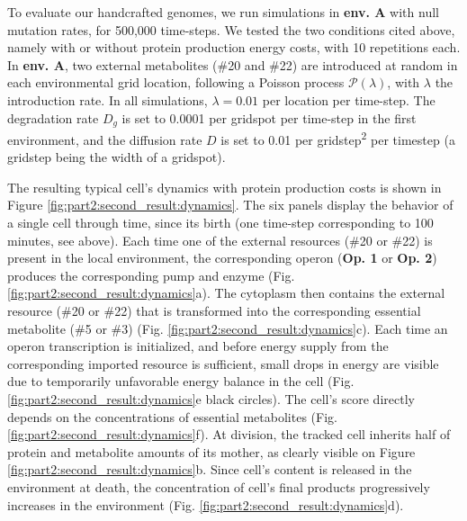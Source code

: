 To evaluate our handcrafted genomes, we run simulations in \textbf{env. A} with null mutation rates, for 500,000 time-steps. We tested the two conditions cited above, namely with or without protein production energy costs, with 10 repetitions each. In \textbf{env. A}, two external metabolites (\#20 and \#22) are introduced at random in each environmental grid location, following a Poisson process $\mathcal{P}(\lambda)$, with $\lambda$ the introduction rate. In all simulations, $\lambda=0.01$ per location per time-step. The degradation rate $D_g$ is set to 0.0001 per gridspot per time-step in the first environment, and the diffusion rate $D$ is set to 0.01 per gridstep\textsuperscript{2} per timestep (a gridstep being the width of a gridspot).

The resulting typical cell's dynamics with protein production costs is shown in Figure \ref{fig:part2:second_result:dynamics}. The six panels display the behavior of a single cell through time, since its birth (one time-step corresponding to 100 minutes, see above). Each time one of the external resources (\#20 or \#22) is present in the local environment, the corresponding operon (\textbf{Op. 1} or \textbf{Op. 2}) produces the corresponding pump and enzyme (Fig. \ref{fig:part2:second_result:dynamics}a). The cytoplasm then contains the external resource (\#20 or \#22) that is transformed into the corresponding essential metabolite (\#5 or \#3) (Fig. \ref{fig:part2:second_result:dynamics}c). Each time an operon transcription is initialized, and before energy supply from the corresponding imported resource is sufficient, small drops in energy are visible due to temporarily unfavorable energy balance in the cell (Fig. \ref{fig:part2:second_result:dynamics}e black circles). The cell's score directly depends on the concentrations of essential metabolites (Fig. \ref{fig:part2:second_result:dynamics}f). At division, the tracked cell inherits half of protein and metabolite amounts of its mother, as clearly visible on Figure \ref{fig:part2:second_result:dynamics}b. Since cell's content is released in the environment at death, the concentration of cell's final products progressively increases in the environment (Fig. \ref{fig:part2:second_result:dynamics}d).

